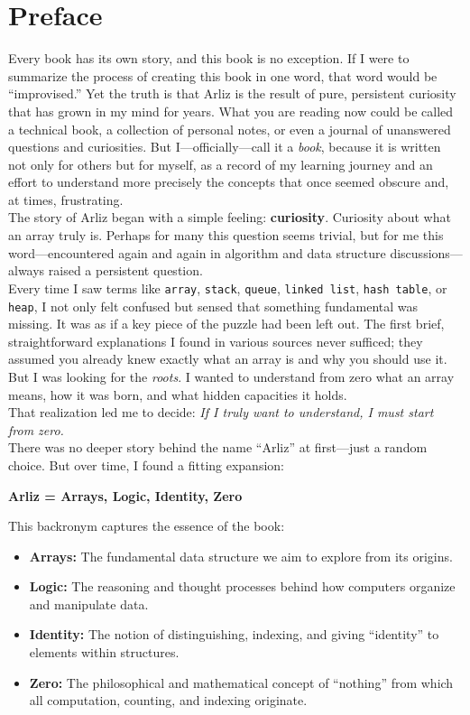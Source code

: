 \chapter{Preface}

Every book has its own story, and this book is no exception. If I were to summarize the process of creating this book in one word, that word would be “improvised.” Yet the truth is that Arliz is the result of pure, persistent curiosity that has grown in my mind for years. What you are reading now could be called a technical book, a collection of personal notes, or even a journal of unanswered questions and curiosities. But I—officially—call it a \emph{book}, because it is written not only for others but for myself, as a record of my learning journey and an effort to understand more precisely the concepts that once seemed obscure and, at times, frustrating.\\
The story of Arliz began with a simple feeling: \textbf{curiosity}.  
Curiosity about what an array truly is. Perhaps for many this question seems trivial, but for me this word—encountered again and again in algorithm and data structure discussions—always raised a persistent question.\\
Every time I saw terms like \texttt{array}, \texttt{stack}, \texttt{queue}, \texttt{linked list}, \texttt{hash table}, or \texttt{heap}, I not only felt confused but sensed that something fundamental was missing. It was as if a key piece of the puzzle had been left out. The first brief, straightforward explanations I found in various sources never sufficed; they assumed you already knew exactly what an array is and why you should use it. But I was looking for the \emph{roots}. I wanted to understand from zero what an array means, how it was born, and what hidden capacities it holds.\\
That realization led me to decide:  
\emph{If I truly want to understand, I must start from zero.}\\	
There was no deeper story behind the name “Arliz” at first—just a random choice. But over time, I found a fitting expansion:
\begin{center}
	\textbf{Arliz = Arrays, Logic, Identity, Zero}
\end{center}
This backronym captures the essence of the book:
\begin{itemize}
	\item \textbf{Arrays:} The fundamental data structure we aim to explore from its origins.
	\item \textbf{Logic:} The reasoning and thought processes behind how computers organize and manipulate data.
	\item \textbf{Identity:} The notion of distinguishing, indexing, and giving “identity” to elements within structures.
	\item \textbf{Zero:} The philosophical and mathematical concept of “nothing” from which all computation, counting, and indexing originate.
\end{itemize}
